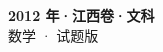 \documentclass[zihao=-4, a4paper]{ctexart}
\begin{document}
\begin{center}
  {\Large\bfseries 2012 年·江西卷·文科}\\[4pt]
  {\large 数学 · 试题版}
\end{center}
\medskip
{}

\end{document}
